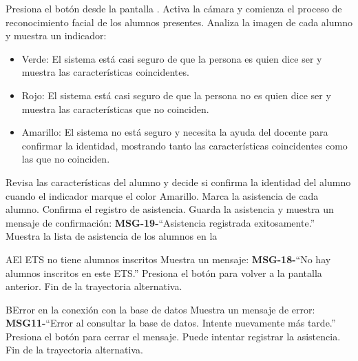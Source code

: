 \begin{UCtrayectoria}
	\UCpaso[\UCactor] Presiona el botón  desde la pantalla .
	\UCpaso Activa la cámara y comienza el proceso de reconocimiento facial de los alumnos presentes.  
	\UCpaso Analiza la imagen de cada alumno y muestra un indicador:
	\begin{itemize}
		\item Verde: El sistema está casi seguro de que la persona es quien dice ser y muestra las características coincidentes.
		\item Rojo: El sistema está casi seguro de que la persona no es quien dice ser y muestra las características que no coinciden. 
		\item Amarillo: El sistema no está seguro y necesita la ayuda del docente para confirmar la identidad, mostrando tanto las características coincidentes como las que no coinciden. 
	\end{itemize}
	\UCpaso[\UCactor] Revisa las características del alumno y decide si confirma la identidad del alumno cuando el indicador marque el color Amarillo. 
	\UCpaso Marca la asistencia de cada alumno.
	\UCpaso[\UCactor] Confirma el registro de asistencia.
	\UCpaso Guarda la asistencia y muestra un mensaje de confirmación: {\bf MSG-19-}{``Asistencia registrada exitosamente.''}
	\UCpaso Muestra la lista de asistencia de los alumnos en la 
\end{UCtrayectoria}
\begin{UCtrayectoriaA}{A}{El ETS no tiene alumnos inscritos}
	\UCpaso Muestra un mensaje: {\bf MSG-18-}{``No hay alumnos inscritos en este ETS.''}
	\UCpaso[\UCactor] Presiona el botón  para volver a la pantalla anterior.
	\UCpaso Fin de la trayectoria alternativa.
\end{UCtrayectoriaA}
\begin{UCtrayectoriaA}{B}{Error en la conexión con la base de datos}
	\UCpaso[\UCactor] Muestra un mensaje de error: {\bf MSG11-}{``Error al consultar la base de datos. Intente nuevamente más tarde.''}
	\UCpaso[\UCactor] Presiona el botón  para cerrar el mensaje.
	\UCpaso[\UCactor] Puede intentar registrar la asistencia.
	\UCpaso Fin de la trayectoria alternativa.
\end{UCtrayectoriaA}


